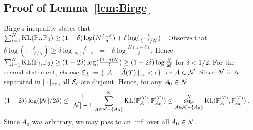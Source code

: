 \subsection{Proof of Lemma~\ref{lem:Birge}\label{BirgeSec}}Birge's inequality states that $\sum_{i=1}^N \mathrm{KL}(\mathbb{P}_i,\mathbb{P}_0) \ge (1-\delta)\log (N\frac{1-\delta}{\delta}) + \delta \log( \frac{\delta}{1 - \delta/N})$ \citep{boucheron13}. Observe that $\delta \log(\frac{\delta}{1 - \delta/N}) \ge \delta \log \frac{\delta}{N(1-\delta)}  = -\delta \log\frac{N(1-\delta)}{\delta}$. Hence $\sum_{i=1}^N \mathrm{KL}(\mathbb{P}_i,\mathbb{P}_0) \ge (1- 2\delta) \log( \frac{(1-\delta)N}{\delta}) \ge (1- 2\delta) \log \frac{N}{2\delta}$ for $\delta < 1/2$. For the second statement, choose $\mathcal{E}_{A} := \{\lVert A - \widehat{A}(T) \rVert_{\mathrm{op}} < \epsilon\}$ for $A \in \mathcal{N}$. Since $\mathcal{N}$ is $2\epsilon$-separated in $\lVert \cdot \rVert_{\mathrm{op}}$, all $\mathcal{E}_i$ are disjoint. Hence, for any $A_0 \in \mathcal{N}$
\begin{eqnarray}
(1-2\delta) \log(|\mathcal{N}|/2\delta) \le \frac{1}{|\mathcal{N}|-1}\sum_{A \in \mathcal{N} - \{A_0\}}^N \mathrm{KL}(\mathbb{P}_A^{(T)},\mathbb{P}_{A_0}^{(T)}) \le \sup_{A \in \mathcal{N} - \{A_0\}}^N \mathrm{KL}(\mathbb{P}_A^{(T)},\mathbb{P}_{A_0}^{(T)}) \:.
\end{eqnarray}
Since $A_0$ was arbitrary, we may pass to an $\inf$ over all $A_0 \in \mathcal{N}$.







